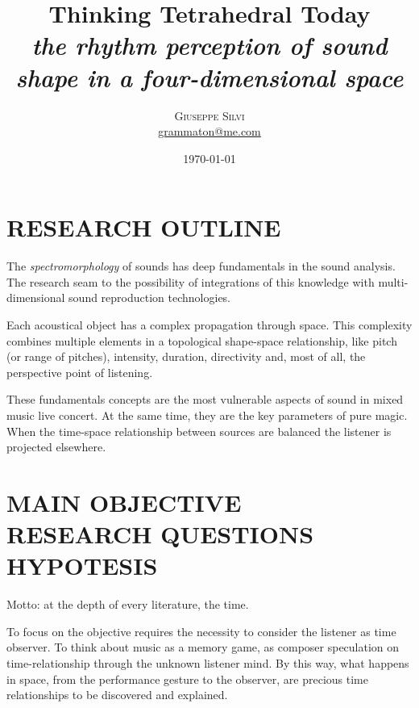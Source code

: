 \documentclass[
	12pt,
	a4paper,
	twocolumn
	]{article}
\title{Thinking Tetrahedral Today \\ \large{\emph{the rhythm perception of sound shape in a four-dimensional space}}} %
\author{%
\textsc{Giuseppe Silvi}\\[1ex]%
\normalsize \href{mailto:me@giuseppesilvi.com}{grammaton@me.com} %
}
\date{\today} %
\begin{document}
\maketitle

\section*{RESEARCH OUTLINE}
The \emph{spectromorphology} of sounds has deep fundamentals in the sound analysis. \cite{smalley_1997} The research seam to the possibility of integrations of this knowledge with multi-dimensional sound reproduction technologies. \cite{fellgett_75, gerzon_70a, gerzon_70b} 

Each acoustical object has a complex propagation through space. This complexity combines multiple elements in a topological shape-space relationship, like pitch (or range of pitches), intensity, duration, directivity and, most of all, the perspective point of listening. 

These fundamentals concepts are the most vulnerable aspects of sound in mixed music live concert. At the same time, they are the key parameters of pure magic. When the time-space relationship between sources are balanced the listener is projected elsewhere.%

\section*{MAIN OBJECTIVE \\ RESEARCH QUESTIONS \\ HYPOTESIS}
%
Motto: at the depth of every literature, the time.

To focus on the objective requires the necessity to consider the listener as time observer. To think about music as a memory game, as composer speculation on time-relationship through the unknown listener mind. By this way, what happens in space, from the performance gesture to the observer, are precious time relationships to be discovered and explained. 
\end{document}
